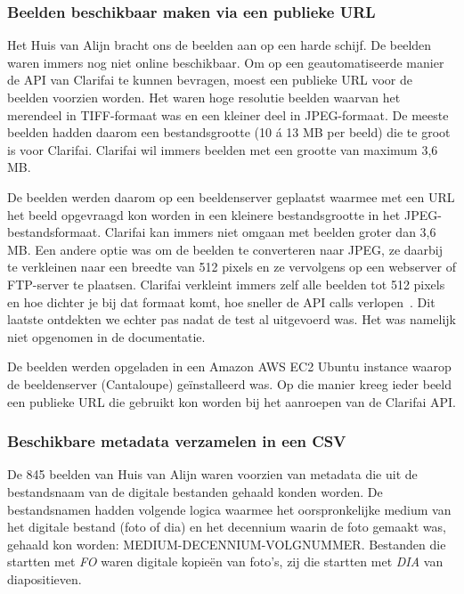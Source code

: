 \subsubsection{Beelden beschikbaar maken via een publieke URL}

Het Huis van Alijn bracht ons de beelden aan op een harde schijf. De beelden waren immers nog niet online beschikbaar. Om op een geautomatiseerde manier de API van Clarifai te kunnen bevragen, moest een publieke URL voor de beelden voorzien worden. Het waren hoge resolutie beelden waarvan het merendeel in TIFF-formaat was en een kleiner deel in JPEG-formaat. De meeste beelden hadden daarom een bestandsgrootte (10 \'{a} 13 MB per beeld) die te groot is voor Clarifai. Clarifai wil immers beelden met een grootte van maximum 3,6 MB. 

De beelden werden daarom op een beeldenserver geplaatst waarmee met een URL het beeld opgevraagd kon worden in een kleinere bestandsgrootte in het JPEG-bestandsformaat. Clarifai kan immers niet omgaan met beelden groter dan 3,6 MB. Een andere optie was om de beelden te converteren naar JPEG, ze daarbij te verkleinen naar een breedte van 512 pixels en ze vervolgens op een webserver of FTP-server te plaatsen. Clarifai verkleint immers zelf alle beelden tot 512 pixels en hoe dichter je bij dat formaat komt, hoe sneller de API calls verlopen~\autocite{Clairbot2019}. Dit laatste ontdekten we echter pas nadat de test al uitgevoerd was. Het was namelijk niet opgenomen in de documentatie.

De beelden werden opgeladen in een Amazon AWS EC2 Ubuntu instance waarop de beeldenserver (Cantaloupe) ge\"{i}nstalleerd was. Op die manier kreeg ieder beeld een publieke URL die gebruikt kon worden bij het aanroepen van de Clarifai API.

\subsubsection{Beschikbare metadata verzamelen in een CSV}
\label{subsubsec:metadata-verzamelen-csv}

De 845 beelden van Huis van Alijn waren voorzien van metadata die uit de bestandsnaam van de digitale bestanden gehaald konden worden. De bestandsnamen hadden volgende logica waarmee het oorspronkelijke medium van het digitale bestand (foto of dia) en het decennium waarin de foto gemaakt was, gehaald kon worden: MEDIUM-DECENNIUM-VOLGNUMMER. Bestanden die startten met \textit{FO} waren digitale kopieën van foto’s, zij die startten met \textit{DIA} van diapositieven. 

